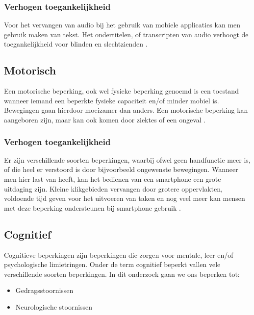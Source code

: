 \subsubsection{Verhogen toegankelijkheid}
Voor het vervangen van audio bij het gebruik van mobiele applicaties kan men gebruik maken van tekst. Het ondertitelen, of transcripten van audio verhoogt de toegankelijkheid voor blinden en slechtzienden \autocite{accessibility2019}.

\subsection{Motorisch}
\label{sec:Motorisch}
Een motorische beperking, ook wel fysieke beperking genoemd is een toestand wanneer iemand een beperkte fysieke capaciteit en/of minder mobiel is. Bewegingen gaan hierdoor moeizamer dan anders. Een motorische beperking kan aangeboren zijn, maar kan ook komen door ziektes of een ongeval \autocite{achieveAU2019}.

\subsubsection{Verhogen toegankelijkheid}
Er zijn verschillende soorten beperkingen, waarbij ofwel geen handfunctie meer is, of die heel er verstoord is door bijvoorbeeld ongewenste bewegingen. Wanneer men hier last van heeft, kan het bedienen van een smartphone een grote uitdaging zijn. 
Kleine klikgebieden vervangen door grotere oppervlakten, voldoende tijd geven voor het uitvoeren van taken en nog veel meer kan mensen met deze beperking ondersteunen bij smartphone gebruik \autocite{accessibility2019}.







\subsection{Cognitief}
\label{sec:cognitief}
Cognitieve beperkingen zijn beperkingen die zorgen voor mentale, leer en/of psychologische limietringen. Onder de term cognitief beperkt vallen vele verschillende soorten beperkingen. In dit onderzoek gaan we ons beperken tot:
\begin{itemize}
    \item Gedragsstoornissen
    \item Neurologische stoornissen 
\end{itemize}

